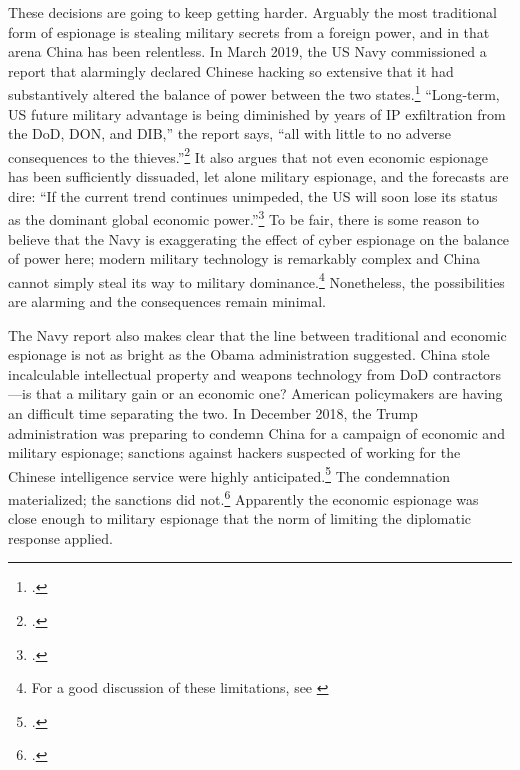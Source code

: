 \documentclass{memoir}
\begin{document}
\begin{refsegment}
These decisions are going to keep getting harder. Arguably the most traditional form of espionage is stealing military secrets from a foreign power, and in that arena China has been relentless. In March 2019, the US Navy commissioned a report that alarmingly declared Chinese hacking so extensive that it had substantively altered the balance of power between the two states.\footcite{lubold_navy_2019} ``Long-term, US future military advantage is being diminished by years of IP exfiltration from the DoD, DON, and DIB,'' the report says, ``all with little to no adverse consequences to the thieves.''\footcite[p.~6]{bayer_cybersecurity_2019} It also argues that not even economic espionage has been sufficiently dissuaded, let alone military espionage, and the forecasts are dire: ``If the current trend continues unimpeded, the US will soon lose its status as the dominant global economic power.''\footcite[p.~5]{bayer_cybersecurity_2019} To be fair, there is some reason to believe that the Navy is exaggerating the effect of cyber espionage on the balance of power here; modern military technology is remarkably complex and China cannot simply steal its way to military dominance.\footnote{For a good discussion of these limitations, see \cite{gilli_why_2019}} Nonetheless, the possibilities are alarming and the consequences remain minimal.

The Navy report also makes clear that the line between traditional and economic espionage is not as bright as the Obama administration suggested. China stole incalculable intellectual property and weapons technology from DoD contractors---is that a military gain or an economic one? American policymakers are having an difficult time separating the two. In December 2018, the Trump administration was preparing to condemn China for a campaign of economic and military espionage; sanctions against hackers suspected of working for the Chinese intelligence service were highly anticipated.\footcite{nakashima_trump_2018-1} The condemnation materialized; the sanctions did not.\footcite{barfield_new_2019} Apparently the economic espionage was close enough to military espionage that the norm of limiting the diplomatic response applied.


\end{refsegment}
\end{document}
